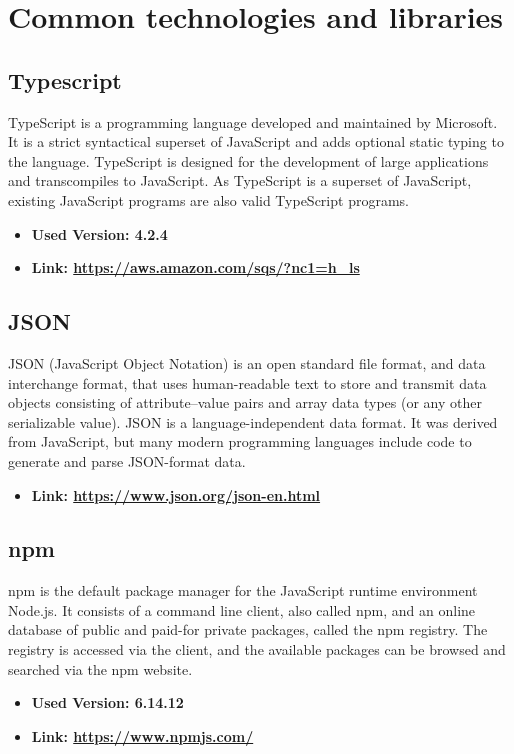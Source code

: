 \section{Common technologies and libraries}
\subsection{Typescript}
TypeScript is a programming language developed and maintained by Microsoft. It is a strict syntactical
superset of JavaScript and adds optional static typing to the language. TypeScript is designed for the
development of large applications and transcompiles to JavaScript. As TypeScript is a superset of JavaScript,
existing JavaScript programs are also valid TypeScript programs.
\begin{itemize}
  \item \textbf{Used Version: 4.2.4}
  \item \textbf{Link: \url{https://aws.amazon.com/sqs/?nc1=h_ls}}
\end{itemize}
\subsection{JSON}
JSON (JavaScript Object Notation) is an open standard file format, and data interchange format, that
uses human-readable text to store and transmit data objects consisting of attribute–value pairs and
array data types (or any other serializable value).
JSON is a language-independent data format. It was derived from JavaScript,
but many modern programming languages include code to generate and parse JSON-format data.
\begin{itemize}
  \item \textbf{Link: \url{https://www.json.org/json-en.html}}
\end{itemize}
\subsection{npm}
npm is the default package manager for the JavaScript runtime environment Node.js.
It consists of a command line client, also called npm, and an online database of public and paid-for private packages,
called the npm registry. The registry is accessed via the client, and the available packages can be browsed and
searched via the npm website.
\begin{itemize}
  \item \textbf{Used Version: 6.14.12}
  \item \textbf{Link: \url{https://www.npmjs.com/}}
\end{itemize}
